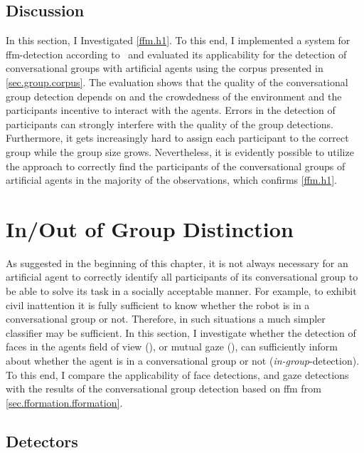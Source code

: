 \subsection{Discussion}

In this section, I Investigated \cref{ffm.h1}.
To this end, I implemented a system for \gls{ffm}-detection according to~ and evaluated its applicability for the detection of \glspl{conversational group} with \glspl{artificial agent} using the corpus presented in \cref{sec.group.corpus}.
The evaluation shows that the quality of the \gls{conversational group} detection depends on and the crowdedness of the environment and the participants incentive to interact with the agents.
Errors in the detection of participants can strongly interfere with the quality of the group detections.
Furthermore, it gets increasingly hard to assign each participant to the correct group while the group size grows.
Nevertheless, it is evidently possible to utilize the approach to correctly find the participants of the \glspl{conversational group} of \glspl{artificial agent} in the majority of the observations, which confirms \cref{ffm.h1}.

\section{In/Out of Group Distinction}\label{sec.fformation.inout}

As suggested in the beginning of this chapter, it is not always necessary for an \gls{artificial agent} to correctly identify all participants of its \gls{conversational group} to be able to solve its task in a socially acceptable manner.
For example, to exhibit \gls{civil inattention} it is fully sufficient to know whether the \gls{robot} is in a \gls{conversational group} or not.
Therefore, in such situations a much simpler classifier may be sufficient.
In this section, I investigate whether the detection of faces in the agents field of view (), or mutual gaze (), can sufficiently inform about whether the agent is in a \gls{conversational group} or not (\emph{in-group}-detection).
To this end, I compare the applicability of face detections, and gaze detections with the results of the \gls{conversational group} detection based on \gls{ffm} from \cref{sec.fformation.fformation}.

\subsection{Detectors}

